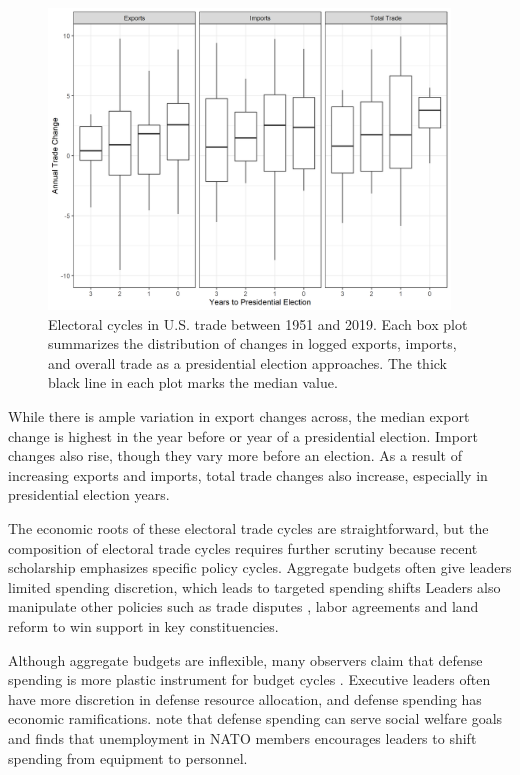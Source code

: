 \documentclass[12pt]{article}
\begin{document}
\begin{figure}
\centering
\includegraphics[width=0.95\textwidth]{../figures/us-trade-cycles.png}
\caption{Electoral cycles in U.S. trade between 1951 and 2019. Each box plot summarizes the distribution of changes in logged exports, imports, and overall trade as a presidential election approaches. The thick black line in each plot marks the median value.}
\label{fig:us-trade-cycles}
\end{figure}


While there is ample variation in export changes across, the median export change is highest in the year before or year of a presidential election.
Import changes also rise, though they vary more before an election. 
As a result of increasing exports and imports, total trade changes also increase, especially in presidential election years.


The economic roots of these electoral trade cycles are straightforward, but the composition of electoral trade cycles requires further scrutiny because recent scholarship emphasizes specific policy cycles.
Aggregate budgets often give leaders limited spending discretion, which leads to targeted spending shifts \citep[pg. 248]{Dubois2016}
Leaders also manipulate other policies such as trade disputes \citep{Conconietal2017}, labor agreements \citep{Ahlquist2010} and land reform \cite{Philips2020} to win support in key constituencies.


Although aggregate budgets are inflexible, many observers claim that defense spending is more plastic instrument for budget cycles \citep{Tufte1978, Mintz1988}.
Executive leaders often have more discretion in defense resource allocation, and defense spending has economic ramifications.
\citet{WhittenWilliams2011} note that defense spending can serve social welfare goals and \citet{Becker2021} finds that unemployment in NATO members encourages leaders to shift spending from equipment to personnel.
\end{document}
